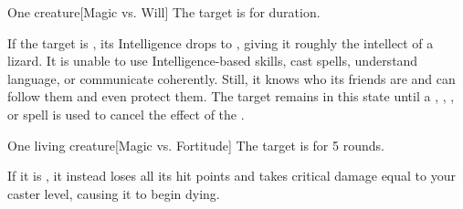 \begin{spellheader}
    \spellrng{\rngclose}
\end{spellheader}
\begin{spelleffects}
    \begin{spelltarget}{One creature}[Magic vs. Will]
        \spellsuccess The target is \bewildered for \durshort duration.

        If the target is \bloodied, its Intelligence drops to , giving it roughly the intellect of a lizard. It is unable to use Intelligence-based skills, cast spells, understand language, or communicate coherently. Still, it knows who its friends are and can follow them and even protect them. The target remains in this state until a , , , or  spell is used to cancel the effect of the .
    \end{spelltarget}
\end{spelleffects}

\begin{spellheader}
    \spellrng{\rngclose}
\end{spellheader}
\begin{spelleffects}
    \begin{spelltarget}{One living creature}[Magic vs. Fortitude]
        \spellsuccess The target is \staggered for 5 rounds.

        If it is \bloodied, it instead loses all its hit points and takes critical damage equal to your caster level, causing it to begin dying.
    \end{spelltarget}
\end{spelleffects}

